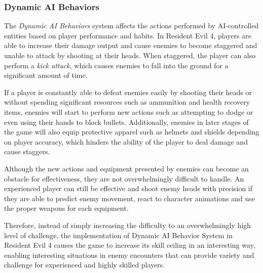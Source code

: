 \subsubsection{Dynamic AI Behaviors}


The \emph{Dynamic AI Behaviors} system affects the actions performed by AI-controlled entities based on player performance and habits. In Resident Evil 4, players are able to increase their damage output and cause enemies to become staggered and unable to attack by shooting at their heads. When staggered, the player can also perform a \emph{kick attack}, which causes enemies to fall into the ground for a significant amount of time. 

If a player is constantly able to defeat enemies easily by shooting their heads or without spending significant resources such as ammunition and health recovery items, enemies will start to perform new actions such as attempting to dodge or even using their hands to block bullets. Additionally, enemies in later stages of the game will also equip protective apparel such as helmets and shields depending on player accuracy, which hinders the ability of the player to deal damage and cause staggers.

Although the new actions and equipment presented by enemies can become an obstacle for effectiveness, they are not overwhelmingly difficult to handle. An experienced player can still be effective and shoot enemy heads with precision if they are able to predict enemy movement, react to character animations and use the proper weapons for each equipment.


Therefore, instead of simply increasing the difficulty to an overwhelmingly high level of challenge, the implementation of Dynamic AI Behavior System in Resident Evil 4 causes the game to increase its skill ceiling in an interesting way, enabling interesting situations in enemy encounters that can provide variety and challenge for experienced and highly skilled players.

